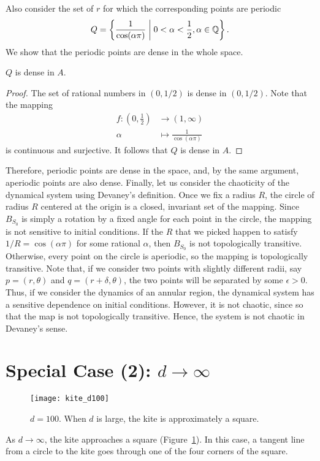 \documentclass[12pt,twoside,draft]{book}
\begin{document}
Also consider the set of $r$ for which the corresponding points are periodic
\begin{equation*}
  Q = \left \{ \frac{1}{\cos(\alpha\pi)} \mathrel{} \middle| \mathrel{} 0 < \alpha < \frac{1}{2}, \alpha \in \mathbb{Q} \right \}.
\end{equation*}
We show that the periodic points are dense in the whole space.
\begin{proposition}
  $Q$ is dense in $A$.
  \begin{proof}
  The set of rational numbers in $(0,1/2)$ is dense in $(0,1/2)$.
  Note that the mapping
    \begin{align*}
      f: (0,\frac{1}{2}) &\to (1, \infty)  \\
      \alpha &\mapsto \frac{1}{\cos(\alpha\pi)}
    \end{align*}
  is continuous and surjective.
  It follows that $Q$ is dense in $A$.
  \end{proof}
\end{proposition}
Therefore, periodic points are dense in the space, and, by the same argument, aperiodic points are also dense.
Finally, let us consider the chaoticity of the dynamical system using Devaney's definition.
Once we fix a radius $R$, the circle of radius $R$ centered at the origin is a closed, invariant set of the mapping.
Since $B_{S_0}$ is simply a rotation by a fixed angle for each point in the circle, the mapping is not sensitive to initial conditions.
If the $R$ that we picked happen to satisfy $1/R = \cos(\alpha\pi)$ for some rational $\alpha$, then $B_{S_0}$ is not topologically transitive.
Otherwise, every point on the circle is aperiodic, so the mapping is topologically transitive.
Note that, if we consider two points with slightly different radii, say $p = (r, \theta)$ and $q = (r + \delta, \theta)$, the two points will be separated by some $\epsilon > 0$.
Thus, if we consider the dynamics of an annular region, the dynamical system has a sensitive dependence on initial conditions.
However, it is not chaotic, since so that the map is not topologically transitive.
Hence, the system is not chaotic in Devaney's sense.

\section{Special Case (2): $d \to \infty$}
\begin{figure}[ht]
  \begin{center}
    \texttt{[image: kite\_d100]}
    \caption{$d = 100$. When $d$ is large, the kite is approximately a square.}
    \label{fig:kite-square}
  \end{center}
\end{figure}
As $d \to \infty$, the kite approaches a square (Figure~\ref{fig:kite-square}).
In this case, a tangent line from a circle to the kite goes through one of the four corners of the square.
\end{document}
